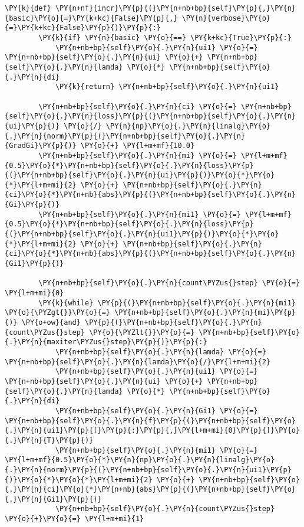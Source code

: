 \begin{tcolorbox}[breakable, size=fbox, boxrule=1pt, pad at break*=1mm,colback=cellbackground, colframe=cellborder]
\begin{Verbatim}[commandchars=\\\{\}]
    \PY{k}{def} \PY{n+nf}{incr}\PY{p}{(}\PY{n+nb+bp}{self}\PY{p}{,}\PY{n}{basic}\PY{o}{=}\PY{k+kc}{False}\PY{p}{,} \PY{n}{verbose}\PY{o}{=}\PY{k+kc}{False}\PY{p}{)}\PY{p}{:}
        \PY{k}{if} \PY{n}{basic} \PY{o}{==} \PY{k+kc}{True}\PY{p}{:}
            \PY{n+nb+bp}{self}\PY{o}{.}\PY{n}{ui1} \PY{o}{=} \PY{n+nb+bp}{self}\PY{o}{.}\PY{n}{ui} \PY{o}{+} \PY{n+nb+bp}{self}\PY{o}{.}\PY{n}{lamda} \PY{o}{*} \PY{n+nb+bp}{self}\PY{o}{.}\PY{n}{di}
            \PY{k}{return} \PY{n+nb+bp}{self}\PY{o}{.}\PY{n}{ui1} 

        \PY{n+nb+bp}{self}\PY{o}{.}\PY{n}{ci} \PY{o}{=} \PY{n+nb+bp}{self}\PY{o}{.}\PY{n}{loss}\PY{p}{(}\PY{n+nb+bp}{self}\PY{o}{.}\PY{n}{ui}\PY{p}{)} \PY{o}{/} \PY{n}{np}\PY{o}{.}\PY{n}{linalg}\PY{o}{.}\PY{n}{norm}\PY{p}{(}\PY{n+nb+bp}{self}\PY{o}{.}\PY{n}{GradGi}\PY{p}{)} \PY{o}{+} \PY{l+m+mf}{10.0}
        \PY{n+nb+bp}{self}\PY{o}{.}\PY{n}{mi} \PY{o}{=} \PY{l+m+mf}{0.5}\PY{o}{*}\PY{n+nb+bp}{self}\PY{o}{.}\PY{n}{loss}\PY{p}{(}\PY{n+nb+bp}{self}\PY{o}{.}\PY{n}{ui}\PY{p}{)}\PY{o}{*}\PY{o}{*}\PY{l+m+mi}{2} \PY{o}{+} \PY{n+nb+bp}{self}\PY{o}{.}\PY{n}{ci}\PY{o}{*}\PY{n+nb}{abs}\PY{p}{(}\PY{n+nb+bp}{self}\PY{o}{.}\PY{n}{Gi}\PY{p}{)}
        \PY{n+nb+bp}{self}\PY{o}{.}\PY{n}{mi1} \PY{o}{=} \PY{l+m+mf}{0.5}\PY{o}{*}\PY{n+nb+bp}{self}\PY{o}{.}\PY{n}{loss}\PY{p}{(}\PY{n+nb+bp}{self}\PY{o}{.}\PY{n}{ui1}\PY{p}{)}\PY{o}{*}\PY{o}{*}\PY{l+m+mi}{2} \PY{o}{+} \PY{n+nb+bp}{self}\PY{o}{.}\PY{n}{ci}\PY{o}{*}\PY{n+nb}{abs}\PY{p}{(}\PY{n+nb+bp}{self}\PY{o}{.}\PY{n}{Gi1}\PY{p}{)}

        \PY{n+nb+bp}{self}\PY{o}{.}\PY{n}{count\PYZus{}step} \PY{o}{=} \PY{l+m+mi}{0}
        \PY{k}{while} \PY{p}{(}\PY{n+nb+bp}{self}\PY{o}{.}\PY{n}{mi1} \PY{o}{\PYZgt{}}\PY{o}{=} \PY{n+nb+bp}{self}\PY{o}{.}\PY{n}{mi}\PY{p}{)} \PY{o+ow}{and} \PY{p}{(}\PY{n+nb+bp}{self}\PY{o}{.}\PY{n}{count\PYZus{}step} \PY{o}{\PYZlt{}}\PY{o}{=} \PY{n+nb+bp}{self}\PY{o}{.}\PY{n}{maxiter\PYZus{}step}\PY{p}{)}\PY{p}{:}
            \PY{n+nb+bp}{self}\PY{o}{.}\PY{n}{lamda} \PY{o}{=} \PY{n+nb+bp}{self}\PY{o}{.}\PY{n}{lamda}\PY{o}{/}\PY{l+m+mi}{2}
            \PY{n+nb+bp}{self}\PY{o}{.}\PY{n}{ui1} \PY{o}{=} \PY{n+nb+bp}{self}\PY{o}{.}\PY{n}{ui} \PY{o}{+} \PY{n+nb+bp}{self}\PY{o}{.}\PY{n}{lamda} \PY{o}{*} \PY{n+nb+bp}{self}\PY{o}{.}\PY{n}{di}
            \PY{n+nb+bp}{self}\PY{o}{.}\PY{n}{Gi1} \PY{o}{=} \PY{n+nb+bp}{self}\PY{o}{.}\PY{n}{f}\PY{p}{(}\PY{n+nb+bp}{self}\PY{o}{.}\PY{n}{ui1}\PY{p}{[}\PY{p}{:}\PY{p}{,}\PY{l+m+mi}{0}\PY{p}{]}\PY{o}{.}\PY{n}{T}\PY{p}{)}
            \PY{n+nb+bp}{self}\PY{o}{.}\PY{n}{mi1} \PY{o}{=} \PY{l+m+mf}{0.5}\PY{o}{*}\PY{n}{np}\PY{o}{.}\PY{n}{linalg}\PY{o}{.}\PY{n}{norm}\PY{p}{(}\PY{n+nb+bp}{self}\PY{o}{.}\PY{n}{ui1}\PY{p}{)}\PY{o}{*}\PY{o}{*}\PY{l+m+mi}{2} \PY{o}{+} \PY{n+nb+bp}{self}\PY{o}{.}\PY{n}{ci}\PY{o}{*}\PY{n+nb}{abs}\PY{p}{(}\PY{n+nb+bp}{self}\PY{o}{.}\PY{n}{Gi1}\PY{p}{)}
            \PY{n+nb+bp}{self}\PY{o}{.}\PY{n}{count\PYZus{}step} \PY{o}{+}\PY{o}{=} \PY{l+m+mi}{1}


\end{Verbatim}
\end{tcolorbox}
